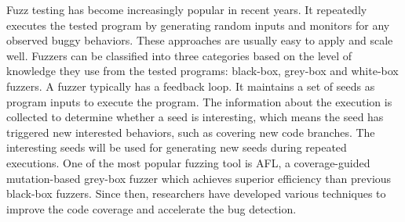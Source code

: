 

Fuzz testing has become increasingly popular in recent years. It repeatedly executes the tested program by generating random inputs and monitors for any observed buggy behaviors. These approaches are usually easy to apply and scale well. Fuzzers can be classified into three categories based on the level of knowledge they use from the tested programs: black-box, grey-box and white-box fuzzers. A fuzzer typically has a feedback loop. It maintains a set of seeds as program inputs to execute the program. The information about the execution is collected to determine whether a seed is interesting, which means the seed has triggered new interested behaviors, such as covering new code branches. The interesting seeds will be used for generating new seeds during repeated executions. One of the most popular fuzzing tool is AFL\cite{afl}, a coverage-guided mutation-based grey-box fuzzer which achieves superior efficiency than previous black-box fuzzers. Since then, researchers have developed various techniques to improve the code coverage and accelerate the bug detection. 


